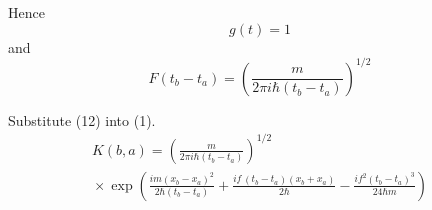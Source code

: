 \documentclass[12pt]{article}
\begin{document}
Hence
\begin{equation*}
g(t)=1
\end{equation*}
and
\begin{equation*}
F(t_b-t_a)=\left(\frac{m}{2\pi i\hbar(t_b-t_a)}\right)^{1/2}
\tag{12}
\end{equation*}

Substitute (12) into (1).
\begin{multline*}
K(b,a)=\left(\frac{m}{2\pi i\hbar(t_b-t_a)}\right)^{1/2}
\\
{}\times\exp\left(
\frac{im(x_b-x_a)^2}{2\hbar(t_b-t_a)}
+\frac{if\,(t_b-t_a)(x_b+x_a)}{2\hbar}
-\frac{if^2(t_b-t_a)^3}{24\hbar m}
\right)
\end{multline*}
\end{document}
